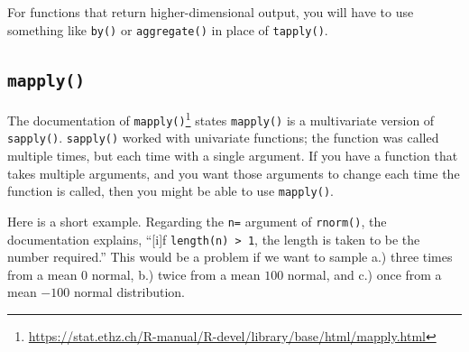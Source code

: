 \documentclass[
  12pt,
  krantz2]{krantz}
\makeatletter
\newenvironment{Shaded}{\begin{snugshade}}{\end{snugshade}}
\newcommand{\DocumentationTok}[1]{\textcolor[rgb]{0.37,0.37,0.37}{\textbf{\textit{#1}}}}
\newcommand{\FunctionTok}[1]{\textcolor[rgb]{0,0,0}{#1}}
\newcommand{\NormalTok}[1]{#1}
\newcommand{\SpecialCharTok}[1]{\textcolor[rgb]{0,0,0}{#1}}
\renewcommand{\href}[2]{#2\footnote{\url{#1}}}
\newenvironment{kframe}{%
\medskip{}
\setlength{\fboxsep}{.8em}
 \def\at@end@of@kframe{}%
 \ifinner\ifhmode%
  \def\at@end@of@kframe{\end{minipage}}%
  \begin{minipage}{\columnwidth}%
 \fi\fi%
 \def\FrameCommand##1{\hskip\@totalleftmargin \hskip-\fboxsep
 \colorbox{shadecolor}{##1}\hskip-\fboxsep
     \hskip-\linewidth \hskip-\@totalleftmargin \hskip\columnwidth}%
 \MakeFramed {\advance\hsize-\width
   \@totalleftmargin\z@ \linewidth\hsize
   \@setminipage}}%
 {\par\unskip\endMakeFramed%
 \at@end@of@kframe}
\renewenvironment{Shaded}{\begin{kframe}}{\end{kframe}}
\makeatother
\begin{document}
\begin{Shaded}
\end{Shaded}

For functions that return higher-dimensional output, you will have to use something like \texttt{by()} or \texttt{aggregate()} in place of \texttt{tapply()}.

\hypertarget{mapply}{%
\subsection{\texorpdfstring{\texttt{mapply()}}{mapply()}}\label{mapply}}

The \href{https://stat.ethz.ch/R-manual/R-devel/library/base/html/mapply.html}{documentation of \texttt{mapply()}} states \texttt{mapply()} is a multivariate version of \texttt{sapply()}. \texttt{sapply()} worked with univariate functions; the function was called multiple times, but each time with a single argument. If you have a function that takes multiple arguments, and you want those arguments to change each time the function is called, then you might be able to use \texttt{mapply()}.

Here is a short example. Regarding the \texttt{n=} argument of \texttt{rnorm()}, the documentation explains, ``{[}i{]}f \texttt{length(n)\ \textgreater{}\ 1}, the length is taken to be the number required.'' This would be a problem if we want to sample a.) three times from a mean \(0\) normal, b.) twice from a mean \(100\) normal, and c.) once from a mean \(-100\) normal distribution.
\end{document}
